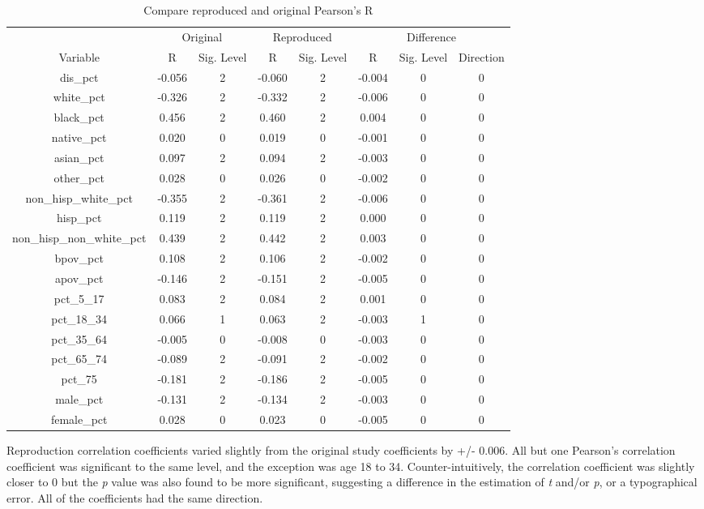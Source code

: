 \documentclass[
]{article}
\begin{document}
\begin{table}
\caption{\label{tab:compare-pearsons-correlation}Compare reproduced and original Pearson's R}
\centering
\begin{tabular}[t]{c|c|c|c|c|c|c|c}
\hline
\multicolumn{1}{c|}{ } & \multicolumn{2}{c|}{Original} & \multicolumn{2}{c|}{Reproduced} & \multicolumn{3}{c}{Difference} \\
\cline{2-3} \cline{4-5} \cline{6-8}
Variable & R & Sig. Level & R & Sig. Level & R & Sig. Level & Direction\\
\hline
dis\_pct & -0.056 & 2 & -0.060 & 2 & -0.004 & 0 & 0\\
\hline
white\_pct & -0.326 & 2 & -0.332 & 2 & -0.006 & 0 & 0\\
\hline
black\_pct & 0.456 & 2 & 0.460 & 2 & 0.004 & 0 & 0\\
\hline
native\_pct & 0.020 & 0 & 0.019 & 0 & -0.001 & 0 & 0\\
\hline
asian\_pct & 0.097 & 2 & 0.094 & 2 & -0.003 & 0 & 0\\
\hline
other\_pct & 0.028 & 0 & 0.026 & 0 & -0.002 & 0 & 0\\
\hline
non\_hisp\_white\_pct & -0.355 & 2 & -0.361 & 2 & -0.006 & 0 & 0\\
\hline
hisp\_pct & 0.119 & 2 & 0.119 & 2 & 0.000 & 0 & 0\\
\hline
non\_hisp\_non\_white\_pct & 0.439 & 2 & 0.442 & 2 & 0.003 & 0 & 0\\
\hline
bpov\_pct & 0.108 & 2 & 0.106 & 2 & -0.002 & 0 & 0\\
\hline
apov\_pct & -0.146 & 2 & -0.151 & 2 & -0.005 & 0 & 0\\
\hline
pct\_5\_17 & 0.083 & 2 & 0.084 & 2 & 0.001 & 0 & 0\\
\hline
pct\_18\_34 & 0.066 & 1 & 0.063 & 2 & -0.003 & 1 & 0\\
\hline
pct\_35\_64 & -0.005 & 0 & -0.008 & 0 & -0.003 & 0 & 0\\
\hline
pct\_65\_74 & -0.089 & 2 & -0.091 & 2 & -0.002 & 0 & 0\\
\hline
pct\_75 & -0.181 & 2 & -0.186 & 2 & -0.005 & 0 & 0\\
\hline
male\_pct & -0.131 & 2 & -0.134 & 2 & -0.003 & 0 & 0\\
\hline
female\_pct & 0.028 & 0 & 0.023 & 0 & -0.005 & 0 & 0\\
\hline
\end{tabular}
\end{table}

Reproduction correlation coefficients varied slightly from the original
study coefficients by +/- 0.006. All but one Pearson's correlation
coefficient was significant to the same level, and the exception was age
18 to 34. Counter-intuitively, the correlation coefficient was slightly
closer to 0 but the \emph{p} value was also found to be more
significant, suggesting a difference in the estimation of \emph{t}
and/or \emph{p}, or a typographical error. All of the coefficients had
the same direction.
\end{document}
